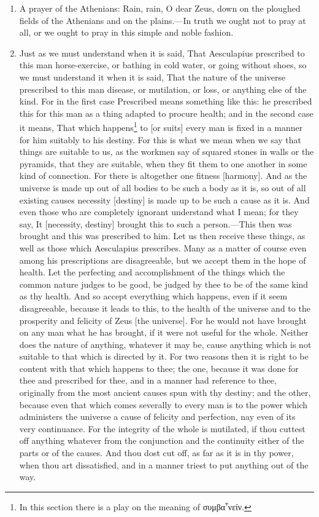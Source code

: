 \begin{enumerate}
\item A prayer of the Athenians: Rain, rain, O dear Zeus, down on the ploughed fields of the Athenians and on the plains.—In truth we ought not to pray at all, or we ought to pray in this simple and noble fashion.

\item Just as we must understand when it is said, That Aesculapius prescribed to this man horse-exercise, or bathing in cold water, or going without shoes, so we must understand it when it is said, That the nature of the universe prescribed to this man disease, or mutilation, or loss, or anything else of the kind. For in the first case Prescribed means something like this: he prescribed this for this man as a thing adapted to procure health; and in the second case it means, That which happens\footnote{In this section there is a play on the meaning of \textgreek{συμβα῟νείν}.} to [{\clarify or suits}] every man is fixed in a manner for him suitably to his destiny. For this is what we mean when we say that things are suitable to us, as the workmen say of squared stones in walls or the pyramids, that they are suitable, when they fit them to one another in some kind of connection. For there is altogether one fitness [{\clarify harmony}]. And as the universe is made up out of all bodies to be such a body as it is, so out of all existing causes necessity [{\clarify destiny}] is made up to be such a cause as it is. And even those who are completely ignorant understand what I mean; for they say, It [{\clarify necessity, destiny}] brought this to such a person.—This then was brought and this was prescribed to him. Let us then receive these things, as well as those which Aesculapius prescribes. Many as a matter of course even among his prescriptions are disagreeable, but we accept them in the hope of health. Let the perfecting and accomplishment of the things which the common nature judges to be good, be judged by thee to be of the same kind as thy health. And so accept everything which happens, even if it seem disagreeable, because it leads to this, to the health of the universe and to the prosperity and felicity of Zeus [{\clarify the universe}]. For he would not have brought on any man what he has brought, if it were not useful for the whole. Neither does the nature of anything, whatever it may be, cause anything which is not suitable to that which is directed by it. For two reasons then it is right to be content with that which happens to thee; the one, because it was done for thee and prescribed for thee, and in a manner had reference to thee, originally from the most ancient causes spun with thy destiny; and the other, because even that which comes severally to every man is to the power which administers the universe a cause of felicity and perfection, nay even of its very continuance. For the integrity of the whole is mutilated, if thou cuttest off anything whatever from the conjunction and the continuity either of the parts or of the causes. And thou dost cut off, as far as it is in thy power, when thou art dissatisfied, and in a manner triest to put anything out of the way.


\end{enumerate}
